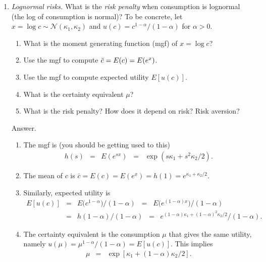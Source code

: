 \documentclass[11pt]{article}
\begin{document}
\begin{enumerate}
\item {\it Lognormal risks.\/}
What is the {\it risk penalty\/} when consumption is lognormal
(the log of consumption is normal)?
To be concrete, let $x = \log c \sim \mathcal{N}(\kappa_1, \kappa_2)$
and $u(c) = c^{1-\alpha}/(1-\alpha)$ for $\alpha> 0$.

\begin{enumerate}
\item What is the moment generating function (mgf) of $x = \log c$?
\item Use the mgf to compute $\bar{c} = E(c) = E(e^x)$.
\item Use the mgf to compute expected utility $ E[u(c)]$.
\item What is the certainty equivalent $\mu$?
\item What is the risk penalty?  How does it depend on risk?  Risk aversion?
\end{enumerate}
%
Answer.
\begin{enumerate}
\item The mgf is (you should be getting used to this)
\begin{eqnarray*}
   h(s) &=&  E(e^{sx}) \;\;=\;\; \exp ( s \kappa_1 + s^2 \kappa_2/2 ).
\end{eqnarray*}

\item The mean of $c$ is
$ \bar{c} = E(c) = E(e^x) = h(1) = e^{\kappa_1+\kappa_2/2}$.

\item Similarly, expected utility is
\begin{eqnarray*}
        E[u(c)] &=& E \Big(c^{1-\alpha}\Big)/(1-\alpha) \;\;=\;\; E \Big(e^{(1-\alpha) x}\Big)/(1-\alpha) \\
        &=& h(1-\alpha)/(1-\alpha) \;\;=\;\; e^{(1-\alpha)\kappa_1+(1-\alpha)^2\kappa_2/2}/(1-\alpha).
\end{eqnarray*}

\item The certainty equivalent is the consumption $\mu$ that gives the same utility,
namely $  u(\mu) = \mu^{1-\alpha}/(1-\alpha) = E[u(c)] $.
This implies
\begin{eqnarray*}
    \mu &=& \exp[ \kappa_1 + (1-\alpha) \kappa_2 /2 ] .
\end{eqnarray*}


\end{enumerate}
\end{enumerate}
\end{document}
